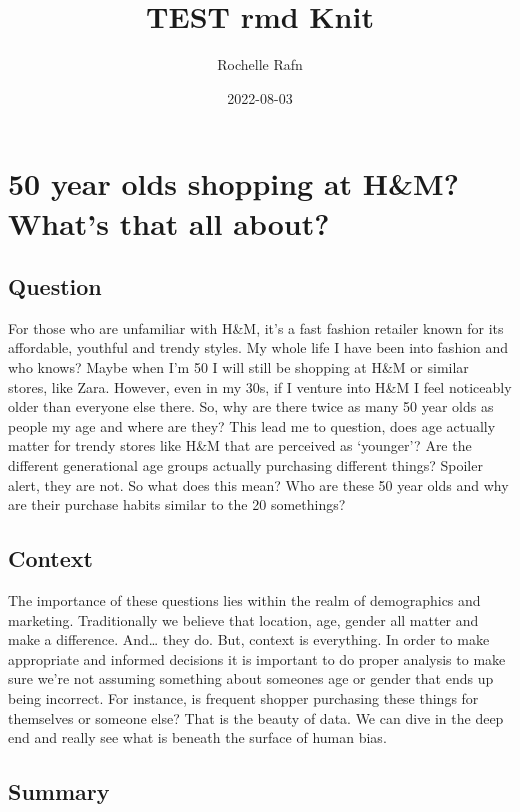 \documentclass[
]{article}
\title{TEST rmd Knit}
\author{Rochelle Rafn}
\date{2022-08-03}
\begin{document}
\maketitle

\hypertarget{year-olds-shopping-at-hm-whats-that-all-about}{%
\section{50 year olds shopping at H\&M? What's that all
about?}\label{year-olds-shopping-at-hm-whats-that-all-about}}

\hypertarget{question}{%
\subsection{Question}\label{question}}

For those who are unfamiliar with H\&M, it's a fast fashion retailer
known for its affordable, youthful and trendy styles. My whole life I
have been into fashion and who knows? Maybe when I'm 50 I will still be
shopping at H\&M or similar stores, like Zara. However, even in my 30s,
if I venture into H\&M I feel noticeably older than everyone else there.
So, why are there twice as many 50 year olds as people my age and where
are they? This lead me to question, does age actually matter for trendy
stores like H\&M that are perceived as `younger'? Are the different
generational age groups actually purchasing different things? Spoiler
alert, they are not. So what does this mean? Who are these 50 year olds
and why are their purchase habits similar to the 20 somethings?

\hypertarget{context}{%
\subsection{Context}\label{context}}

The importance of these questions lies within the realm of demographics
and marketing. Traditionally we believe that location, age, gender all
matter and make a difference. And\ldots{} they do. But, context is
everything. In order to make appropriate and informed decisions it is
important to do proper analysis to make sure we're not assuming
something about someones age or gender that ends up being incorrect. For
instance, is frequent shopper purchasing these things for themselves or
someone else? That is the beauty of data. We can dive in the deep end
and really see what is beneath the surface of human bias.

\hypertarget{summary}{%
\subsection{Summary}\label{summary}}
\end{document}
